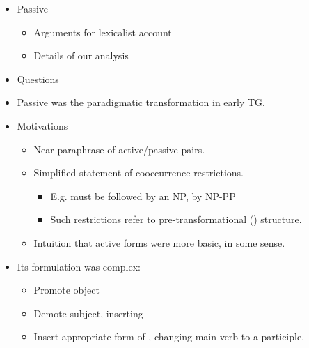 \documentclass[a4paper,landscape,headrule,footrule,dvips]{foils}
\begin{document}
\maketitle





\begin{itemize}
\item Passive
  \begin{itemize}
  \item Arguments for lexicalist account
  \item Details of our analysis
  \end{itemize}
\item Questions
\end{itemize}


\begin{itemize}
\item Passive was the paradigmatic transformation in early TG.
\item Motivations
  \begin{itemize}
  \item Near paraphrase of active/passive pairs.
  \item Simplified statement of cooccurrence restrictions.
    \begin{itemize}
    \item E.g.  must be followed by an NP,  by NP-PP
    \item Such restrictions refer to pre-transformational () structure.
    \end{itemize}
  \item Intuition that active forms were more basic, in some sense. 
  \end{itemize}
\item Its formulation was complex:  
  \begin{itemize}
  \item Promote object
  \item Demote subject, inserting 
  \item Insert appropriate form of , changing main verb to a participle.
  \end{itemize}
\end{itemize}

\end{document}
